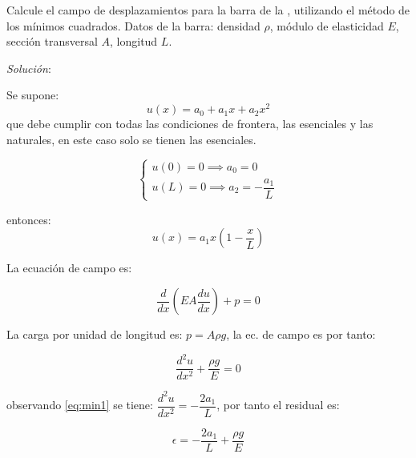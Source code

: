 \begin{exercise}
	Calcule el campo de desplazamientos para la barra de la , utilizando el método de los mínimos cuadrados. Datos de la barra: densidad $\rho$, módulo de elasticidad $E$, sección transversal $A$, longitud $L$.
	
	\begin{marginfigure}[-.5cm]
		\centering
		
	\end{marginfigure}
	
	
\textit{Solución}:

\vspace{2mm}
		Se supone:
		\begin{equation}
			u(x) = a_0 + a_1 x + a_2 x^2
		\end{equation}
		que debe cumplir con todas las condiciones de frontera, las esenciales y las naturales, en este caso solo se tienen las esenciales.
		
		\begin{equation}
			\begin{cases}
				u(0) = 0 \implies a_0 = 0 \\
				u(L) = 0 \implies a_2 = -\dfrac{a_1}{L}
			\end{cases}
		\end{equation}
		
		entonces:
		\begin{equation}
			u(x) = a_1 x \left(1 - \dfrac{x}{L}\right)
			\label{eq:min1}
		\end{equation}
		
		La ecuación de campo es:
		
		\begin{equation}
			\dfrac{d}{dx} \left(EA \dfrac{du}{dx}\right) + p = 0
		\end{equation}
		
		La carga por unidad de longitud es: $p = A \rho g$, la ec. de campo es por tanto:
		
		\begin{equation}
			\dfrac{d^2 u}{dx^2} + \dfrac{\rho g}{E} = 0
		\end{equation}
		
		observando \eqref{eq:min1} se tiene: $\dfrac{d^2 u}{dx^2} = -\dfrac{2a_1}{L}$, por tanto el residual es:
		
		\begin{equation}
			\epsilon = -\dfrac{2a_1}{L} + \dfrac{\rho g}{E}
		\end{equation}
		

\end{exercise}
